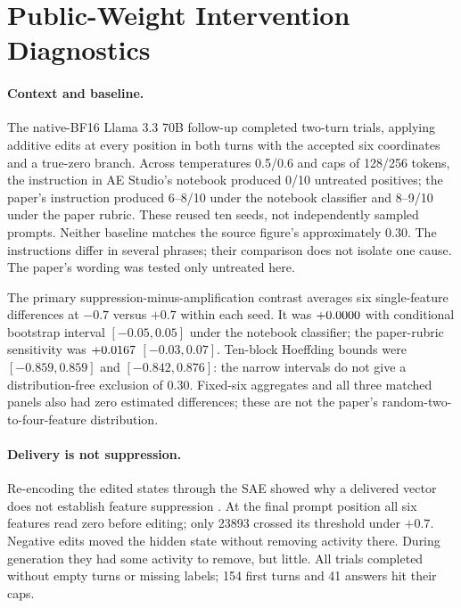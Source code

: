 \section{Public-Weight Intervention Diagnostics}
\label{sec:source-alignment}

\paragraph{Context and baseline.}
The native-BF16 Llama 3.3 70B follow-up completed
\SourceBehavioralTrials{} two-turn trials, applying additive edits at every
position in both turns with the accepted six coordinates and a true-zero
branch. Across temperatures 0.5/0.6 and caps of 128/256 tokens, the
instruction in AE Studio's notebook \citep{aestudio2026deception}
produced 0/10 untreated positives; the paper's instruction
produced 6--8/10 under the notebook classifier and 8--9/10 under the paper
rubric. These reused ten seeds, not independently sampled prompts. Neither
baseline matches the source figure's approximately 0.30. The instructions
differ in several phrases; their comparison does not isolate one cause.
The paper's wording was tested only untreated here.

The primary suppression-minus-amplification contrast averages six
single-feature differences at $-0.7$ versus $+0.7$ within each seed. It was
$+0.0000{}$ with conditional bootstrap interval
$[-0.05,0.05]$ under the notebook classifier; the paper-rubric sensitivity
was $+0.0167{}$ $[-0.03,0.07]$. Ten-block Hoeffding bounds were
$[-0.859,0.859]$ and $[-0.842,0.876]$: the narrow intervals do not give a
distribution-free exclusion of 0.30. Fixed-six aggregates and all three
matched panels also had zero estimated differences; these are not the
paper's random-two-to-four-feature distribution.

\paragraph{Delivery is not suppression.}
Re-encoding the edited states through the SAE showed why a delivered vector
does not establish feature suppression \citep{cunningham2023sparse}.
At the final prompt position all six features read zero before editing;
only 23893 crossed its threshold under $+0.7$. Negative edits moved the
hidden state without removing activity there. During generation they had
some activity to remove, but little. All trials completed without empty
turns or missing labels; 154 first turns and 41 answers hit their caps.

